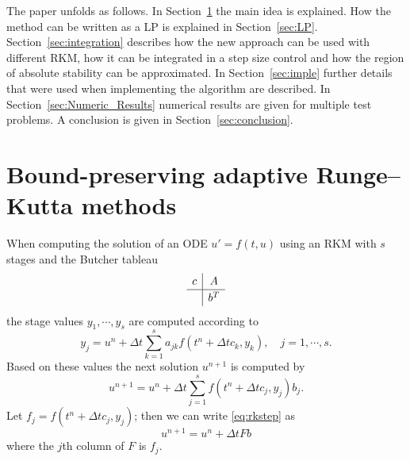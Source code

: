 \documentclass[a4paper]{article}
\numberwithin{equation}{section}
\theoremstyle{plain}
\theoremstyle{definition}
\numberwithin{theorem}{section}
\newcommand{\dt}{{\Delta t}}
\newcommand{\1}{\mathbbm{1}}
\begin{document}
The paper unfolds as follows. In Section~\ref{sec:main_idea} the main idea is explained. How the method can be written as a LP is explained in Section~\ref{sec:LP}.
Section~\ref{sec:integration} describes how the new approach can be used with different RKM, how it can be integrated in a step size control and how the region of absolute stability can be approximated.
In Section~\ref{sec:imple} further details that were used when implementing the algorithm are described.
In Section~\ref{sec:Numeric_Results} numerical results are given for multiple test problems.
A conclusion is given in Section~\ref{sec:conclusion}.



\section{Bound-preserving adaptive Runge--Kutta methods}\label{sec:main_idea}

When computing the solution of an ODE $u ' = f(t,u) $ using an RKM with $s$ stages and the Butcher tableau
\begin{align}
\renewcommand{\arraystretch}{1.2}
\begin{array}{c|c}
c &  A \\
\hline
 & b^T\\
\end{array}
\end{align}
the stage values $y_1,\cdots,y_s$ are computed according to
\begin{equation}
y_j =  u^n + \dt \sum_{k = 1}^{s} a_{jk} f(t^n + \dt c_k,y_k),  \quad j = 1,\cdots,s.
\end{equation}
Based on these values the next solution $u^{n+1}$ is computed by
\begin{equation} \label{eq:rkstep}
u^{n+1} = u^n + \dt \sum_{j  = 1}^s f(t^n + \dt c_j,y_j) b_j .
\end{equation}
Let $f_j = f(t^n + \dt c_j,y_j)$; then we can write \eqref{eq:rkstep} as
\begin{equation}\label{eq:Combination}
u^{n+1} = u^n + \dt F b
\end{equation}
where the $j$th column of $F$ is $f_j$.
\end{document}
